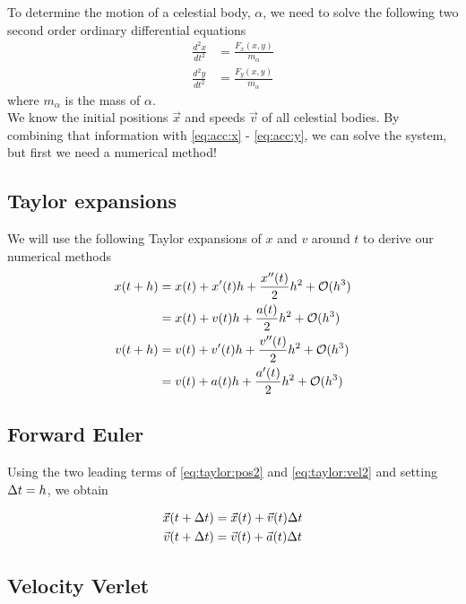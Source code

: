 \documentclass[a4paper]{article}
\begin{document}
To determine the motion of a celestial body, $\alpha$, we need to solve the following two second order ordinary differential equations
\begin{align}
\frac{d^2x}{dt^2} &= \frac{F_x(x,y)}{m_{\alpha}} \label{eq:acc:x}\\
\frac{d^2y}{dt^2} &= \frac{F_y(x,y)}{m_{\alpha}} \label{eq:acc:y}
\end{align}
where $m_{\alpha}$ is the mass of $\alpha$.\\

We know the initial positions $\vec{x}$ and speeds $\vec{v}$ of all celestial bodies. By combining that information with \ref{eq:acc:x} - \ref{eq:acc:y}, we can solve the system, but first we need a numerical method!




\subsection{Taylor expansions}
We will use the following Taylor expansions of $x$ and $v$ around $t$ to derive our numerical methods
\begin{align}
    x(t + h) &= x(t) + x'(t) h + \frac{x''(t)}{2} h^2 + {\mathcal{O}}(h^3) \label{eq:taylor:pos1}\\
    &= x(t) + v(t) h + \frac{a(t)}{2} h^2 + {\mathcal{O}}(h^3) \label{eq:taylor:pos2} \\
    v(t + h) &= v(t) + v'(t) h + \frac{v''(t)}{2} h^2 + {\mathcal{O}}(h^3) \label{eq:taylor:vel1} \\
    &= v(t) + a(t) h + \frac{a'(t)}{2} h^2 + {\mathcal{O}}(h^3) \label{eq:taylor:vel2}
\end{align}

\subsection{Forward Euler}
Using the two leading terms of \ref{eq:taylor:pos2} and \ref{eq:taylor:vel2} and setting ${\Delta t} = h$, we obtain

\begin{align}
    \vec{x}(t + {\Delta t}) &= \vec{x}(t) + \vec{v}(t){\Delta t}  \label{eq:forwardeuler:pos} \\
    \vec{v}(t + {\Delta t}) &= \vec{v}(t) + \vec{a}(t){\Delta t} \label{eq:forwardeuler:vel}
\end{align}

\subsection{Velocity Verlet}
\end{document}
